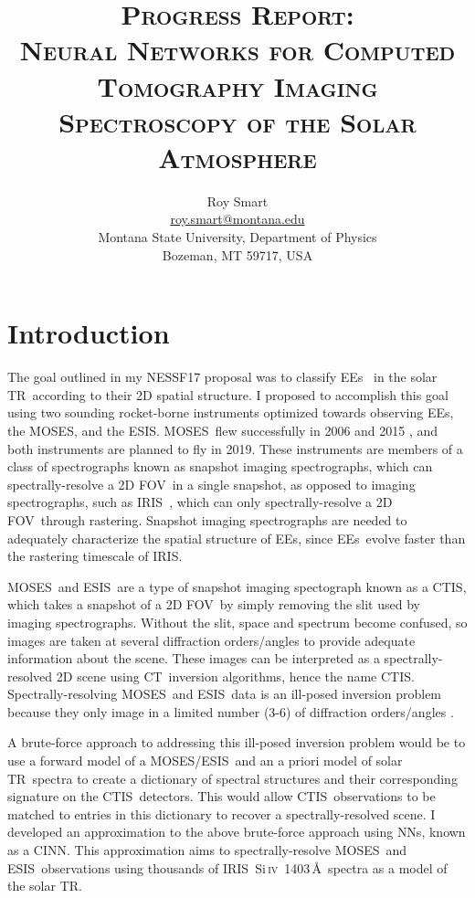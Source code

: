 \documentclass[10pt,letterpaper]{article}
\title{\textsc{Progress Report: \\ Neural Networks for Computed Tomography Imaging Spectroscopy of the Solar Atmosphere}}
\author{Roy Smart \\ \url{roy.smart@montana.edu} \\ Montana State University, Department of Physics \\ Bozeman, MT 59717, USA}
\newcommand{\SiIV}{Si\,\textsc{iv}~1403\,\AA}
\newcommand{\TR}{\ac{TR}}
\newcommand{\EEs}{\acp{EE}}
\newcommand{\CT}{\ac{CT}}
\newcommand{\CTIS}{\ac{CTIS}}
\newcommand{\MOSES}{\ac{MOSES}}
\newcommand{\ESIS}{\ac{ESIS}}
\newcommand{\FOV}{\ac{FOV}}
\newcommand{\NNs}{\acp{NN}}
\newcommand{\CINN}{\ac{CINN}}
\newcommand{\IRIS}{\ac{IRIS}}
\begin{document}
	
	\maketitle
	
	
	\section{Introduction}
	
		The goal outlined in my NESSF17 proposal was to classify \EEs\ \citep{Brueckner1983} in the solar \TR\ according to their 2D spatial structure.
		I proposed to accomplish this goal using two sounding rocket-borne instruments optimized towards observing \EEs, the \MOSES \citep{kankel1}, and the \ESIS.
		\MOSES\ flew successfully in 2006 \citep{fox1} and 2015 \cite{smart1}, and both instruments are planned to fly in 2019.
		These instruments are members of a class of spectrographs known as snapshot imaging spectrographs, which can spectrally-resolve a 2D \FOV\ in a single snapshot, as opposed to imaging spectrographs, such as \IRIS\ \citep{DePontieu2014}, which can only spectrally-resolve a 2D \FOV\ through rastering.
		Snapshot imaging spectrographs are needed to adequately characterize the spatial structure of \EEs, since \EEs\ evolve faster than the rastering timescale of \IRIS \citep{kankel1,DePontieu2014}.
		
		\MOSES\ and \ESIS\ are a type of snapshot imaging spectograph known as a \CTIS \citep{Okamoto:91}, which takes a snapshot of a 2D \FOV\ by simply removing the slit used by imaging spectrographs.
		Without the slit, space and spectrum become confused, so images are taken at several diffraction orders/angles to provide adequate information about the scene.
		These images can be interpreted as a spectrally-resolved 2D scene using \CT\ inversion algorithms, hence the name \CTIS.
		Spectrally-resolving \MOSES\ and \ESIS\ data is an ill-posed inversion problem because they only image in a limited number (3-6) of diffraction orders/angles \citep{kankel1}.
		
		A brute-force approach to addressing this ill-posed inversion problem would be to use a forward model of a \MOSES/\ESIS\ and an a priori model of solar \TR\ spectra to create a dictionary of spectral structures and their corresponding signature on the \CTIS\ detectors.
		This would allow \CTIS\ observations to be matched to entries in this dictionary to recover a spectrally-resolved scene.
		I developed an approximation to the above brute-force approach using \NNs, known as a \CINN.
		This approximation aims to spectrally-resolve \MOSES\ and \ESIS\ observations using thousands of \IRIS\ \SiIV\ spectra as a model of the solar \TR.
		
\end{document}
